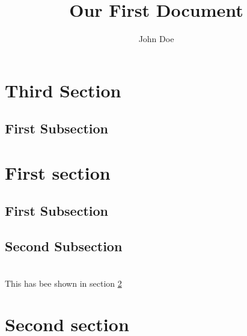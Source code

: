 \documentclass[a4paper,12pt]{article}
\author{John Doe}
\title{Our First Document}
\begin{document}
\maketitle
\tableofcontents
\section{Third Section}
\blindtext[5]
\subsection{First Subsection}
\blindtext
\section{First section}\label{sec:second}
\blindtext
\subsection{First Subsection}
\blindtext
\subsection{Second Subsection}
\blindtext\\
This has bee shown in section \ref{sec:second}
\section{Second section}
\end{document}
